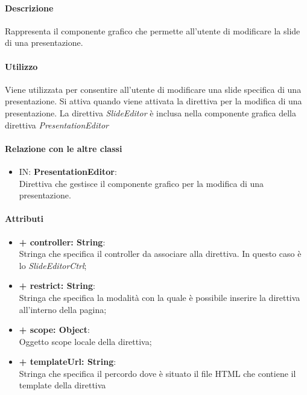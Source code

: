 	\paragraph{Descrizione}
	Rappresenta il componente grafico che permette all'utente di modificare la \gls{slide} di una presentazione.
	
	\paragraph{Utilizzo}
	Viene utilizzata per consentire all'utente di modificare una \gls{slide} specifica di una presentazione. Si attiva quando viene attivata la direttiva per la modifica di una presentazione. La direttiva \textit{SlideEditor} è inclusa nella componente grafica della direttiva \textit{PresentationEditor}
	
	\paragraph{Relazione con le altre classi}
	\begin{itemize}
		\item IN: \textbf{PresentationEditor}:\\
		Direttiva che gestisce il componente grafico per la modifica di una presentazione.
	\end{itemize}
	
	\paragraph{Attributi}
	\begin{itemize}
		\item \textbf{+ controller: String}:\\
			Stringa che specifica il controller da associare alla direttiva. In questo caso è lo \textit{SlideEditorCtrl};
		\item \textbf{+ restrict: String}:\\
			Stringa che specifica la modalità con la quale è possibile inserire la direttiva all'interno della pagina;
		\item \textbf{+ scope: Object}:\\
			Oggetto scope locale della direttiva;
		\item \textbf{+ templateUrl: String}:\\
			Stringa che specifica il percordo dove è situato il file \gls{HTML} che contiene il \gls{template} della direttiva
	\end{itemize}
\newpage


